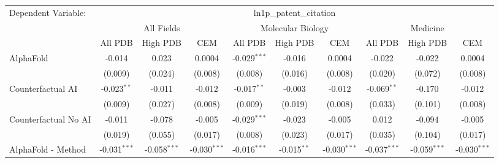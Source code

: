 \begingroup
\centering
\begin{tabular}{lccccccccc}
   \tabularnewline \midrule \midrule
   Dependent Variable: & \multicolumn{9}{c}{ln1p\_patent\_citation}\\
 & \multicolumn{3}{c}{All Fields} & \multicolumn{3}{c}{Molecular Biology} & \multicolumn{3}{c}{Medicine} \\
\cmidrule(lr){2-7} \cmidrule(lr){5-10} \cmidrule(lr){8-7}
 & \multicolumn{1}{c}{All PDB} & \multicolumn{1}{c}{High PDB} & \multicolumn{1}{c}{CEM} & \multicolumn{1}{c}{All PDB} & \multicolumn{1}{c}{High PDB} & \multicolumn{1}{c}{CEM} & \multicolumn{1}{c}{All PDB} & \multicolumn{1}{c}{High PDB} & \multicolumn{1}{c}{CEM} \\
\cmidrule(lr){2-3} \cmidrule(lr){3-4} \cmidrule(lr){4-5} \cmidrule(lr){5-6} \cmidrule(lr){6-7} \cmidrule(lr){7-8} \cmidrule(lr){8-9} \cmidrule(lr){9-10} \cmidrule(lr){10-3}
   AlphaFold                                                   & -0.014         & 0.023          & 0.0004         & -0.029$^{***}$ & -0.016        & 0.0004         & -0.022         & -0.022         & 0.0004\\   
                                                               & (0.009)        & (0.024)        & (0.008)        & (0.008)        & (0.016)       & (0.008)        & (0.020)        & (0.072)        & (0.008)\\   
   Counterfactual AI                                           & -0.023$^{**}$  & -0.011         & -0.012         & -0.017$^{**}$  & -0.003        & -0.012         & -0.069$^{**}$  & -0.170         & -0.012\\   
                                                               & (0.009)        & (0.027)        & (0.008)        & (0.009)        & (0.019)       & (0.008)        & (0.033)        & (0.101)        & (0.008)\\   
   Counterfactual No AI                                        & -0.011         & -0.078         & -0.005         & -0.029$^{***}$ & -0.023        & -0.005         & 0.012          & -0.094         & -0.005\\   
                                                               & (0.019)        & (0.055)        & (0.017)        & (0.008)        & (0.023)       & (0.017)        & (0.035)        & (0.104)        & (0.017)\\   
   AlphaFold - Method                                          & -0.031$^{***}$ & -0.058$^{***}$ & -0.030$^{***}$ & -0.016$^{***}$ & -0.015$^{**}$ & -0.030$^{***}$ & -0.037$^{***}$ & -0.059$^{***}$ & -0.030$^{***}$\\   

\end{tabular}
